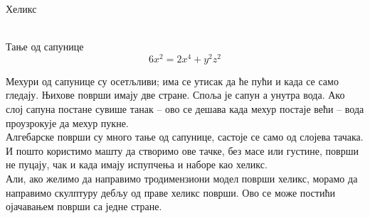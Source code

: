 \documentclass[en]{./../../common/SurferDesc}%
\begin{document}
\footnotesize


\begin{surferPage}
  \begin{surferTitle}Хеликс \end{surferTitle}   \\
Тање од сапунице\\
  \smallskip
\[6x^2	= 2x^4	+ y^2	z^2\]

\singlespacing
Мехури од сапунице су осетљливи; има се утисак да ће пући и када се само гледају. Њихове површи имају две стране. Споља је сапун а унутра вода. Ако слој сапуна постане сувише танак – ово се дешава када мехур постаје већи – вода проузрокује да мехур пукне.\\
\vspace{0,3cm}
Алгебарске површи су много тање од сапунице, састоје се само од слојева тачака. И пошто користимо машту да створимо ове тачке, без масе или густине, површи не пуцају, чак и када имају испупчења и наборе као хеликс.\\
\vspace{0,3cm}
Али, ако желимо да направимо тродимензиони модел површи хеликс, морамо да направимо скулптуру дебљу од праве хеликс површи. Ово се може постићи ојачавањем површи са једне стране.

  \begin{surferText}
     \end{surferText}
\end{surferPage}



 
\end{document}
